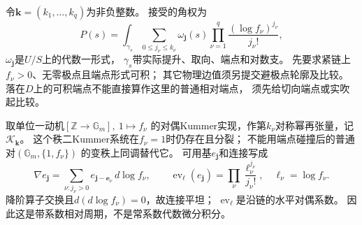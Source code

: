 \documentclass[11pt,a4paper]{ctexart}
\theoremstyle{cnplain}\newtheorem{theorem}{定理}[section]
\theoremstyle{definition}\newtheorem{definition}[theorem]{定义}
\theoremstyle{remark}\newtheorem{remark}[theorem]{注}
\begin{document}
令$\mathbf k=(k_1,\ldots,k_q)$为非负整数。
接受的角权为
\begin{equation}\label{eq:logangle}
 P(s)=\int_{\gamma_s}
       \sum_{0\le j_\nu\le k_\nu}
       \omega_{\mathbf j}(s)\prod_{\nu=1}^q
             \frac{(\log f_\nu)^{j_\nu}}{j_\nu!},
\end{equation}
$\omega_{\mathbf j}$是$U/S$上的代数一形式，
$\gamma_s$带实际提升、取向、端点和对数支。
先要求紧链上$f_\nu>0$、无零极点且端点形式可积；
其它物理边值须另提交避极点轮廓及比较。
落在$D$上的可积端点不能直接算作这里的普通相对端点，
须先给切向端点或实吹起比较。

取单位一动机$[\mathbb Z\to\mathbb G_m],\ 1\mapsto f_\nu$
的对偶Kummer实现，作第$k_\nu$对称幂再张量，记$\mathcal K_{\mathbf k}$。
这个秩二Kummer系统在$f_\nu=1$时仍存在且分裂；
不能用端点碰撞后的普通对$(\mathbb G_m,\{1,f_\nu\})$
的变秩上同调替代它。
可用基$e_{\mathbf j}$和连接写成
\begin{equation}\label{eq:Kconnection}
 \nabla e_{\mathbf j}
 =\sum_{\nu:j_\nu>0}e_{\mathbf j-\mathbf e_\nu}\,d\log f_\nu,\qquad
 \operatorname{ev}_{\boldsymbol\ell}(e_{\mathbf j})
 =\prod_\nu\frac{\ell_\nu^{j_\nu}}{j_\nu!},\quad \ell_\nu=\log f_\nu .
\end{equation}
降阶算子交换且$d(d\log f_\nu)=0$，故连接平坦；
$\operatorname{ev}_{\boldsymbol\ell}$是沿链的水平对偶系数。
因此这是带系数相对周期，不是常系数代数微分积分。
\end{document}

